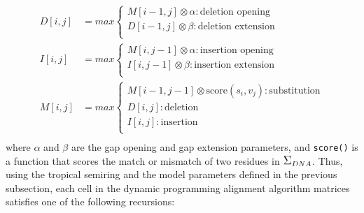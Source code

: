 \begingroup
\allowdisplaybreaks
\begin{align*}
    D[i,j] &= max \begin{cases}
        M[i-1, j] \otimes \alpha: \text{deletion opening}\\
        D[i-1, j] \otimes \beta: \text{deletion extension}\\
    \end{cases}\\
    I[i,j] &= max \begin{cases}
        M[i ,j-1] \otimes \alpha: \text{insertion opening}\\
        I[i, j-1] \otimes \beta: \text{insertion extension}\\
    \end{cases}\\
    M[i,j] &= max \begin{cases}
        M[i-1, j-1] \otimes \text{score}(s_i, v_j): \text{substitution}\\
        D[i, j]: \text{deletion}\\
        I[i, j]: \text{insertion}\\
    \end{cases}\\
\end{align*}
\endgroup
\noindent where $\alpha$ and $\beta$ are the gap opening and gap extension parameters, and \verb|score()| is a function that scores the match or mismatch of two residues in $\grande{\Sigma}_{DNA}$.
Thus, using the tropical semiring and the model parameters defined in the previous subsection,
each cell in the dynamic programming alignment algorithm matrices satisfies one of the following recursions:

